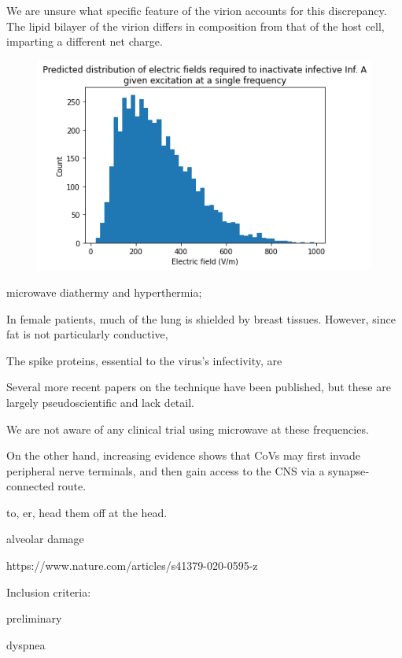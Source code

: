 \documentclass[fleqn,10pt]{paper}
\begin{document}
We are unsure what specific feature of the virion accounts for this discrepancy. The lipid bilayer of the virion differs in composition from that of the host cell, imparting a different net charge.


\begin{figure}[H]
	\centering
	\includegraphics[width=\textwidth]{biology/output_35_1.png}
\end{figure}



microwave diathermy and hyperthermia; 

In female patients, much of the lung is shielded by breast tissues. However, since fat is not particularly conductive, 

The spike proteins, essential to the virus's infectivity, are 


Several more recent papers \cite{Theoretical2020} on the technique have been published, but these are largely pseudoscientific and lack detail. 

We are not aware of any clinical trial using microwave at these frequencies.

\cite{neuroinvasive2020}

On the other hand, increasing evidence
shows that CoVs may first invade peripheral nerve terminals, and
then gain access to the CNS via a synapse‐connected route.

to, er, head them off at the head.

alveolar damage

https://www.nature.com/articles/s41379-020-0595-z

Inclusion criteria:

preliminary

dyspnea
\end{document}
